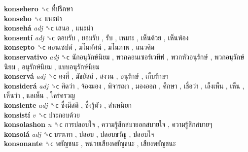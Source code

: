 \textbf{konsehero} ␝ϲ   ที่ปรึกษา   \\
\textbf{konseho} ␝ϲ   แนะนำ   \\
\textbf{konsehá} \emph{adj}  ␝ϲ   เสนอ ,  แนะนำ   \\
\textbf{konsentí} \emph{adj}  ␝ϲ   ตอบรับ ,  ยอมรับ ,  รับ ,  เหมาะ ,  เห็นด้วย ,  เห็นพ้อง   \\
\textbf{konsepto} ␝ϲ   คอนเซปต์ ,  มโนทัศน์ ,  มโนภาพ ,  แนวคิด   \\
\textbf{konservativo} \emph{adj}  ␝ϲ   นักอนุรักษ์นิยม ,  พวกคอนเซอร์เวทีฟ ,  พวกหัวอนุรักษ์ ,  พวกอนุรักษ์นิยม ,  อนุรักษ์นิยม ,  แบบอนุรักษ์นิยม   \\
\textbf{konservá} \emph{adj}  ␝ϲ   คงที่ ,  มัธยัสถ์ ,  สงวน ,  อนุรักษ์ ,  เก็บรักษา   \\
\textbf{konsiderá} \emph{adj}  ␝ϲ   คิดว่า ,  จ้องมอง ,  พิจารณา ,  มองออก ,  ศึกษา ,  เชื่อว่า ,  เล็งเห็น ,  เห็น ,  เห็นว่า ,  แลเห็น ,  ใคร่ครวญ   \\
\textbf{konsiente} \emph{adj}  ␝ϲ   ซึ่งมีสติ ,  ซึ่งรู้ตัว ,  สำเหนียก   \\
\textbf{konsistí} \emph{v}  ␝ϲ   ประกอบด้วย   \\
\textbf{konsolashon} \emph{n}  ␝ϲ   การปลอบใจ ,  ความรู้สึกสบายอกสบายใจ ,  ความรู้สึกสบายๆ   \\
\textbf{konsolá} \emph{adj}  ␝ϲ   บรรเทา ,  ปลอบ ,  ปลอบขวัญ ,  ปลอบใจ   \\
\textbf{konsonante} ␝ϲ   พยัญชนะ ,  หน่วยเสียงพยัญชนะ ,  เสียงพยัญชนะ   \\
